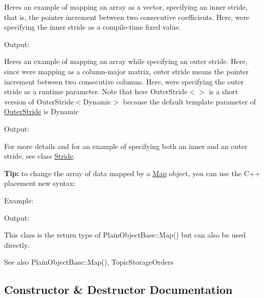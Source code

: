 Here\textquotesingle{}s an example of mapping an array as a vector, specifying an inner stride, that is, the pointer increment between two consecutive coefficients. Here, we\textquotesingle{}re specifying the inner stride as a compile-\/time fixed value. 
\begin{DoxyCodeInclude}{0}
\end{DoxyCodeInclude}
 Output\+: 
\begin{DoxyVerbInclude}
\end{DoxyVerbInclude}


Here\textquotesingle{}s an example of mapping an array while specifying an outer stride. Here, since we\textquotesingle{}re mapping as a column-\/major matrix, \textquotesingle{}outer stride\textquotesingle{} means the pointer increment between two consecutive columns. Here, we\textquotesingle{}re specifying the outer stride as a runtime parameter. Note that here {\ttfamily Outer\+Stride$<$$>$} is a short version of {\ttfamily Outer\+Stride$<$\+Dynamic$>$} because the default template parameter of \mbox{\hyperlink{class_eigen_1_1_outer_stride}{Outer\+Stride}} is {\ttfamily Dynamic} 
\begin{DoxyCodeInclude}{0}
\end{DoxyCodeInclude}
 Output\+: 
\begin{DoxyVerbInclude}
\end{DoxyVerbInclude}


For more details and for an example of specifying both an inner and an outer stride, see class \mbox{\hyperlink{class_eigen_1_1_stride}{Stride}}.

{\bfseries{Tip\+:}} to change the array of data mapped by a \mbox{\hyperlink{class_eigen_1_1_map}{Map}} object, you can use the C++ placement new syntax\+:

Example\+: 
\begin{DoxyCodeInclude}{0}
\end{DoxyCodeInclude}
 Output\+: 
\begin{DoxyVerbInclude}
\end{DoxyVerbInclude}


This class is the return type of Plain\+Object\+Base\+::\+Map() but can also be used directly.

\begin{DoxySeeAlso}{See also}
Plain\+Object\+Base\+::\+Map(), Topic\+Storage\+Orders 
\end{DoxySeeAlso}


\subsection{Constructor \& Destructor Documentation}
\mbox{\label{class_eigen_1_1_map_ac95a2928eaa9c727c4499d3723f8f459}} 
